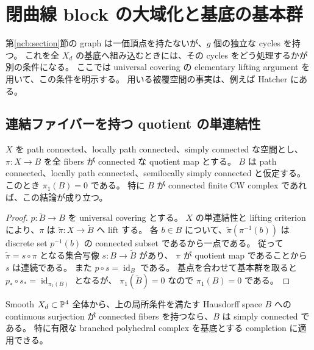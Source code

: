 \section{閉曲線 block の大域化と基底の基本群}
\label{bct:section}

第\ref{ncb:section}節の graph は一価頂点を持たないが、$g$ 個の独立な cycles を持つ。
これを全 $X_d$ の基底へ組み込むときには、その cycles をどう処理するかが別の条件になる。
ここでは universal covering の elementary lifting argument を用いて、この条件を明示する。
用いる被覆空間の事実は、例えば Hatcher \cite[Section 1.3]{hatcher-bct} にある。

\subsection{連結ファイバーを持つ quotient の単連結性}

\begin{proposition}\label{bct:simply-connected}
$X$ を path connected、locally path connected、simply connected な空間とし、
$\pi:X\to B$ を全 fibers が connected な quotient map とする。
$B$ は path connected、locally path connected、semilocally simply connected と仮定する。
このとき $\pi_1(B)=0$ である。
特に $B$ が connected finite CW complex であれば、この結論が成り立つ。
\end{proposition}

\begin{proof}
$p:\widetilde B\to B$ を universal covering とする。
$X$ の単連結性と lifting criterion により、$\pi$ は
$\widetilde\pi:X\to\widetilde B$ へ lift する。
各 $b\in B$ について、$\widetilde\pi(\pi^{-1}(b))$ は discrete set $p^{-1}(b)$ の
connected subset であるから一点である。
従って $\widetilde\pi=s\circ\pi$ となる集合写像 $s:B\to\widetilde B$ があり、
$\pi$ が quotient map であることから $s$ は連続である。
また $p\circ s=\operatorname{id}_B$ である。
基点を合わせて基本群を取ると $p_*\circ s_*=\operatorname{id}_{\pi_1(B)}$ となるが、
$\pi_1(\widetilde B)=0$ なので $\pi_1(B)=0$ である。
\end{proof}

\begin{corollary}[全超曲面の基底に課される条件]\label{bct:hypersurface}
Smooth $X_d\subset\mathbb P^4$ 全体から、上の局所条件を満たす Hausdorff space $B$ への
continuous surjection が connected fibers を持つなら、$B$ は simply connected である。
特に有限な branched polyhedral complex を基底とする completion に適用できる。
\end{corollary}

